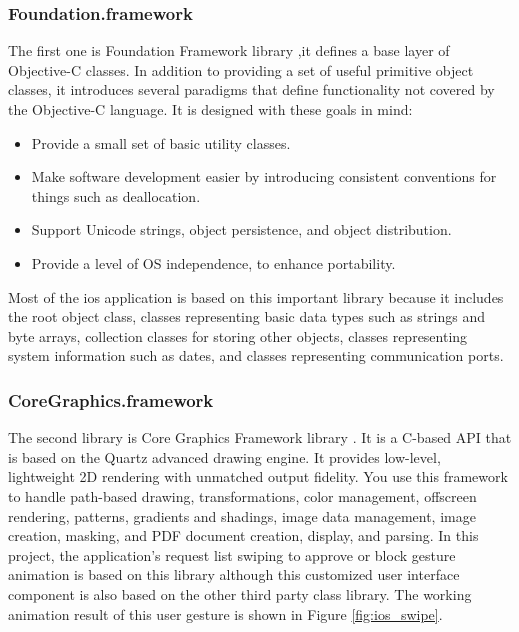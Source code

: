\subsubsection{Foundation.framework}
\par The first one is Foundation Framework library \cite{foundationlib},it defines a base layer of Objective-C classes. In addition to providing a set of useful primitive object classes, it introduces several paradigms that define functionality not covered by the Objective-C language. It is designed with these goals in mind:
\begin{itemize}
  \item Provide a small set of basic utility classes.
  \item Make software development easier by introducing consistent conventions for things such as deallocation.
  \item Support Unicode strings, object persistence, and object distribution.
  \item Provide a level of OS independence, to enhance portability.
\end{itemize}
\par Most of the \gls{ios} application is based on this important library because it includes the root object class, classes representing basic data types such as strings and byte arrays, collection classes for storing other objects, classes representing system information such as dates, and classes representing communication ports.

\subsubsection{CoreGraphics.framework}
\par The second library is Core Graphics Framework library \cite{coregraphicslib}. It is a C-based API that is based on the Quartz advanced drawing engine. It provides low-level, lightweight 2D rendering with unmatched output fidelity. You use this framework to handle path-based drawing, transformations, color management, offscreen rendering, patterns, gradients and shadings, image data management, image creation, masking, and PDF document creation, display, and parsing. In this project, the application's request list swiping to approve or block gesture animation is based on this library although this customized user interface component is also based on the other third party class library. The working animation result of this user gesture is shown in Figure \ref{fig:ios_swipe}.

